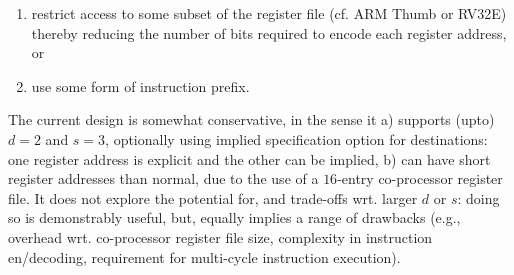 \begin{itemize}
      \begin{enumerate}
      \item restrict access to some subset of the register file 
            (cf. ARM Thumb or RV32E) 
            thereby reducing the number of bits required to encode each  
            register address,
            or
      \item use some form of instruction prefix.
      \end{enumerate}
      
      \noindent
      The current design is somewhat conservative, in the sense it 
      a) supports (upto) $d = 2$ and $s = 3$, 
         optionally using implied specification option for destinations: 
         one register address is explicit and the other can be implied,
      b) can have short register addresses than normal, due to the use
         of a $16$-entry co-processor register file.
      It does not explore the potential for, and trade-offs wrt. larger 
      $d$ or $s$: doing so is demonstrably useful, but, equally implies
      a range of drawbacks (e.g., overhead wrt. co-processor register 
      file size, complexity in instruction en/decoding, requirement for
      multi-cycle instruction execution).

\end{itemize}

